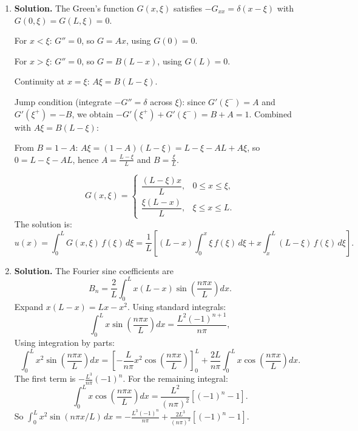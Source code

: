 \begin{enumerate}
The wave equation becomes $\hat{u}_{tt}=-c^2k^2\hat{u}$, with $\hat{u}(k,0)=1$ (since $\mathcal{F}\{\delta(x)\}=1$) and $\hat{u}_t(k,0)=0$.

Solution: $\hat{u}(k,t)=\cos(ckt)$.

Invert:
\[
u(x,t)=\frac{1}{2\pi}\int_{-\infty}^{\infty}\cos(ckt)\,e^{ikx}\,dk = \frac{1}{2\pi}\int_{-\infty}^{\infty}\frac{e^{i(x+ct)k}+e^{i(x-ct)k}}{2}\,dk
\]
\[
= \frac{1}{2}[\delta(x+ct)+\delta(x-ct)].
\]
\[
\boxed{u(x,t)=\frac{1}{2}\bigl[\delta(x-ct)+\delta(x+ct)\bigr]}.
\]
This is d'Alembert's solution for impulsive initial displacement.

\item \textbf{Solution.}
The Green's function $G(x,\xi)$ satisfies $-G_{xx}=\delta(x-\xi)$ with $G(0,\xi)=G(L,\xi)=0$.

For $x<\xi$: $G''=0$, so $G=Ax$, using $G(0)=0$.

For $x>\xi$: $G''=0$, so $G=B(L-x)$, using $G(L)=0$.

Continuity at $x=\xi$: $A\xi=B(L-\xi)$.

Jump condition (integrate $-G''=\delta$ across $\xi$): since $G'(\xi^-)=A$ and $G'(\xi^+)=-B$, we obtain $-G'(\xi^+)+G'(\xi^-)=B+A=1$. Combined with $A\xi = B(L-\xi)$:

From $B=1-A$: $A\xi=(1-A)(L-\xi)=L-\xi-AL+A\xi$, so $0=L-\xi-AL$, hence $A=\frac{L-\xi}{L}$ and $B=\frac{\xi}{L}$.

\[
G(x,\xi)=\begin{cases}\dfrac{(L-\xi)x}{L}, & 0\le x\le\xi,\\[6pt] \dfrac{\xi(L-x)}{L}, & \xi\le x\le L.\end{cases}
\]
The solution is:
\[
\boxed{u(x)=\int_0^L G(x,\xi)\,f(\xi)\,d\xi = \frac{1}{L}\left[(L-x)\int_0^x \xi\,f(\xi)\,d\xi + x\int_x^L (L-\xi)\,f(\xi)\,d\xi\right]}.
\]

\item \textbf{Solution.}
The Fourier sine coefficients are
\[
B_n = \frac{2}{L}\int_0^L x(L-x)\sin\!\left(\frac{n\pi x}{L}\right)dx.
\]
Expand $x(L-x)=Lx-x^2$. Using standard integrals:
\[
\int_0^L x\sin\!\left(\frac{n\pi x}{L}\right)dx = \frac{L^2(-1)^{n+1}}{n\pi},
\]
Using integration by parts:
\[
\int_0^L x^2\sin\!\left(\frac{n\pi x}{L}\right)dx = \left[-\frac{L}{n\pi}x^2\cos\!\left(\frac{n\pi x}{L}\right)\right]_0^L + \frac{2L}{n\pi}\int_0^L x\cos\!\left(\frac{n\pi x}{L}\right)dx.
\]
The first term is $-\frac{L^3}{n\pi}(-1)^n$. For the remaining integral:
\[
\int_0^L x\cos\!\left(\frac{n\pi x}{L}\right)dx = \frac{L^2}{(n\pi)^2}[(-1)^n-1].
\]
So $\int_0^L x^2\sin(n\pi x/L)\,dx = -\frac{L^3(-1)^n}{n\pi}+\frac{2L^3}{(n\pi)^3}[(-1)^n-1]$.


\end{enumerate}
